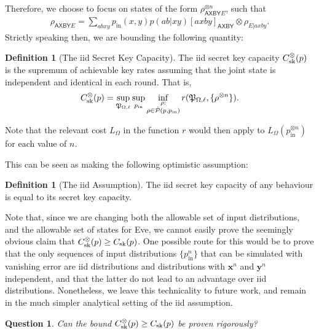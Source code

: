 \documentclass[10pt, a4paper]{article}
\numberwithin{equation}{section} %
\newcounter{stmt} %
\theoremstyle{definition}
\newtheorem{defn}[stmt]{Definition}
\theoremstyle{plain}
\newtheorem{question}{Question}
\newcommand{\?}{\mathrel{?}} %
\newcommand{\cvec}[1]{\boldsymbol{\mathbf{#1}}}    %
\newcommand{\crv}[1]{\mathsf{#1}}
\newcommand{\proj}[2][]{{[#2]}_{#1}}
\newcommand{\compatstates}[3][]{\hat{\mathcal{P}}#1(#2,#3)}
\newcommand{\proto}[2][\ell]{\mathfrak{P}_{#2, #1}}
\newcommand{\prin}[1][p]{#1_{\mathrm{in}}}
\newcommand{\sk}{\rm sk}
\begin{document}
    Therefore, we choose to focus on states of the form \( \rho_{\crv{AXBY}E}^{\otimes n} \), such that
    \begin{align}
      \rho_{\crv{AXBY}E} = \sum_{abxy} \prin(x,y) p(ab|xy) \proj[\crv{AXBY}]{axby} \otimes \rho_{E|axby}.
    \end{align}
    Strictly speaking then, we are bounding the following quantity:
    \begin{defn}[The iid Secret Key Capacity]\label{def:seckeycapbehaviid}
      The iid secret key capacity \(C_{\sk}^{\otimes}(p)\) is the supremum of achievable key rates assuming that the joint state is independent and identical in each round. That is,
      \begin{equation}
        C_{\sk}^{\otimes}(p) = \sup_{\proto{\Omega}} \sup_{\prin} \inf_{\substack{\rho : \\ \rho \in \compatstates{p}{\prin}}} r(\proto{\Omega}, \{\rho^{\otimes{n}}\}).
      \end{equation}
    \end{defn}
    Note that the relevant cost \(L_{\Omega}\) in the function \(r\) would then apply to \(L_{\Omega}(\prin^{\otimes n})\) for each value of \(n\).

    This can be seen as making the following optimistic assumption:
    \begin{defn}[The iid Assumption]
      The iid secret key capacity of any behaviour is equal to its secret key capacity.
    \end{defn}
    Note that, since we are changing both the allowable set of input distributions, and the allowable set of states for Eve, we cannot easily prove the seemingly obvious claim that \(C_{\sk}^{\otimes}(p) \geq C_{\sk}(p)\). One possible route for this would be to prove that the only sequences of input distributions \(\{\prin^n\}\) that can be simulated with vanishing error are iid distributions and distributions with \(\cvec{x}^n\) and \(\cvec{y}^n\) independent, and that the latter do not lead to an advantage over iid distributions. Nonetheless, we leave this technicality to future work, and remain in the much simpler analytical setting of the iid assumption.

    \begin{question}
      Can the bound \(C_{\sk}^{\otimes}(p) \geq C_{\sk}(p)\) be proven rigorously?
    \end{question}
\end{document}
